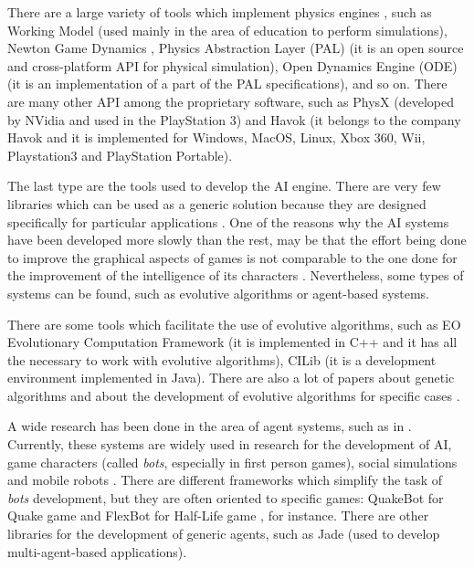 There are a large variety of tools which implement physics engines \cite{Seugling2006}, such as Working Model
\cite{WModel} (used mainly in the area of education to perform simulations), Newton Game
Dynamics \cite{NGDynamics}, Physics Abstraction Layer (PAL) \cite{PAL} (it is an open source and
cross-platform API for physical simulation), Open Dynamics Engine (ODE) \cite{ODE} (it is an
implementation of a part of the PAL specifications), and so on.  There are many other API among
the proprietary software, such as PhysX \cite{Physx} (developed by NVidia
and used in the PlayStation 3) and Havok \cite{Havok} (it belongs to the company Havok and it is
implemented for Windows, MacOS, Linux, Xbox 360, Wii, Playstation3 and PlayStation Portable).

The last type are the tools used to develop the AI engine. There are very few libraries which can
be used as a generic solution because they are designed specifically for particular applications \cite{Sanchez2004}.
One of the reasons why the AI systems have been developed more slowly than the rest, may be that
the effort being done to improve the graphical aspects of games is not comparable to the one done
for the improvement of the intelligence of its characters \cite{Laird2001}. Nevertheless, some
types of systems can be found, such as evolutive algorithms or agent-based systems.

There are some tools which facilitate the use of evolutive algorithms, such as EO Evolutionary
Computation Framework \cite{EOECF} (it is implemented in C++ and it has all the necessary to work
with evolutive algorithms), CILib \cite{CILib} (it is a development environment implemented in
Java). There are also a lot of papers about genetic algorithms and about the development of
evolutive algorithms for specific cases \cite{Georgios2004,Chris2007,Robert2005}.

A wide research has been done in the area of agent systems, such as in
\cite{Wooldridge1997,Wood2000}. Currently, these systems are widely used in research for the
development of AI, game characters (called \textit{bots}, especially in first person games), social
simulations and mobile robots \cite{Novak2007,Sanchez2004,John2007,Kenyon2006}.
There are different frameworks which
simplify the task of \textit{bots} development, but they are often oriented to specific games:
QuakeBot for Quake game and FlexBot for Half-Life game \cite{Laird2001,Aaron2002}, for instance.
There are other libraries for the development of generic agents, such as Jade \cite{Jade} (used to
develop multi-agent-based applications).

